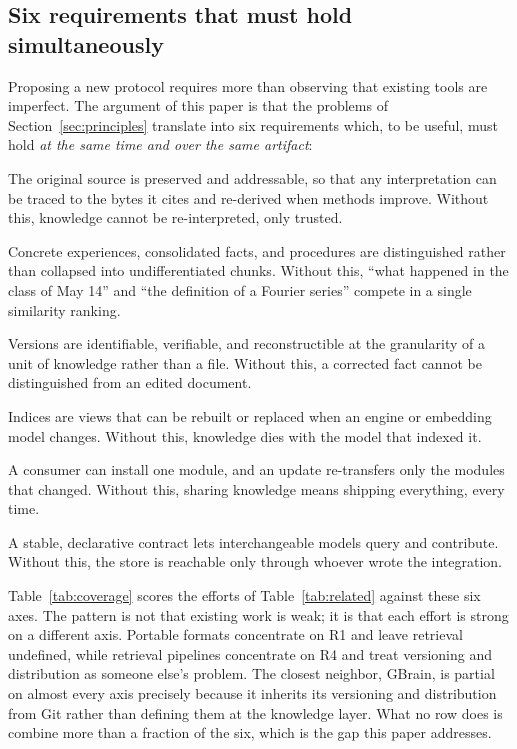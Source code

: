 \documentclass[11pt,a4paper]{article}
\begin{document}
\subsection{Six requirements that must hold simultaneously}
\label{sec:requirements}

Proposing a new protocol requires more than observing that existing tools are
imperfect. The argument of this paper is that the problems of
Section~\ref{sec:principles} translate into six requirements which, to be
useful, must hold \emph{at the same time and over the same artifact}:

\begin{description}[leftmargin=2.6em, style=sameline, font=\normalfont\bfseries]
  \item[R1. Canonical evidence.] The original source is preserved and
addressable, so that any interpretation can be traced to the bytes it cites
and re-derived when methods improve. Without this, knowledge cannot be
re-interpreted, only trusted.
  \item[R2. Typed memories.] Concrete experiences, consolidated facts, and
  procedures are distinguished rather than collapsed into undifferentiated
  chunks. Without this, ``what happened in the class of May 14'' and ``the
  definition of a Fourier series'' compete in a single similarity ranking.
  \item[R3. Verifiable versioning at knowledge granularity.] Versions are
  identifiable, verifiable, and reconstructible at the granularity of a unit of
  knowledge rather than a file. Without this, a corrected fact cannot be
  distinguished from an edited document.
  \item[R4. Derived, replaceable indices.] Indices are views that can be
  rebuilt or replaced when an engine or embedding model changes. Without this,
  knowledge dies with the model that indexed it.
  \item[R5. Selective, module-granular distribution.] A consumer can install one
module, and an update re-transfers only the modules that changed. Without
this, sharing knowledge means shipping everything, every time.
  \item[R6. Model-agnostic access contract.] A stable, declarative contract
  lets interchangeable models query and contribute. Without this, the store is
  reachable only through whoever wrote the integration.
\end{description}

Table~\ref{tab:coverage} scores the efforts of Table~\ref{tab:related} against
these six axes. The pattern is not that existing work is weak; it is that each
effort is strong on a different axis. Portable formats concentrate on R1 and
leave retrieval undefined, while retrieval pipelines concentrate on R4 and treat
versioning and distribution as someone else's problem. The closest neighbor,
GBrain, is partial on almost every axis precisely because it inherits its
versioning and distribution from Git rather than defining them at the knowledge
layer. What no row does is combine more than a fraction of the six, which is the
gap this paper addresses.
\end{document}

